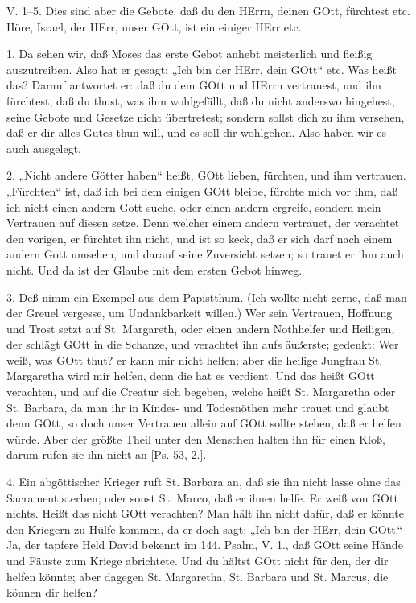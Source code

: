 \begin{schriftzitat}
V. 1–5. Dies sind aber die Gebote, daß du den HErrn, deinen GOtt, fürchtest etc. Höre, Israel, der HErr, unser GOtt, ist ein einiger HErr etc.
\end{schriftzitat}

1. Da sehen wir, daß Moses das erste Gebot anhebt meisterlich und fleißig auszutreiben. Also hat er gesagt: „Ich bin der HErr, dein GOtt“ etc. Was heißt das? Darauf antwortet er: daß du dem GOtt und HErrn vertrauest, und ihn fürchtest, daß du thust, was ihm wohlgefällt, daß du nicht anderswo hingehest, seine Gebote und Gesetze nicht übertretest; sondern sollst dich zu ihm versehen, daß er dir alles Gutes thun will, und es soll dir wohlgehen. Also haben wir es auch ausgelegt.

2. „Nicht andere Götter haben“ heißt, GOtt lieben, fürchten, und ihm vertrauen. „Fürchten“ ist, daß ich bei dem einigen GOtt bleibe, fürchte
mich vor ihm, daß ich nicht einen andern Gott suche, oder einen andern ergreife, sondern mein Vertrauen auf diesen setze. Denn welcher einem andern vertrauet, der verachtet den vorigen, er fürchtet ihn nicht, und ist so keck, daß er sich darf nach einem andern Gott umsehen, und darauf seine Zuversicht setzen; so trauet er ihm auch nicht. Und da ist der Glaube mit dem ersten Gebot hinweg.

3. Deß nimm ein Exempel aus dem Papistthum. (Ich wollte nicht gerne, daß man der Greuel vergesse, um Undankbarkeit willen.) Wer sein Vertrauen, Hoffnung und Trost setzt auf St. Margareth, oder einen andern Nothhelfer und Heiligen, der schlägt GOtt in die Schanze, und verachtet ihn aufs äußerste; gedenkt: Wer weiß, was GOtt thut? er kann mir nicht helfen; aber die heilige Jungfrau St. Margaretha wird mir helfen, denn die hat es verdient. Und das heißt GOtt verachten, und auf die Creatur sich begeben, welche heißt St. Margaretha oder St. Barbara, da man ihr in Kindes- und Todesnöthen mehr trauet und glaubt denn GOtt, so doch unser Vertrauen allein auf GOtt sollte stehen, daß er helfen würde. Aber der größte Theil unter den Menschen halten ihn für einen Kloß, darum rufen sie ihn nicht an [Ps. 53, 2.].

4. Ein abgöttischer Krieger ruft St. Barbara an, daß sie ihn nicht lasse ohne das Sacrament sterben; oder sonst St. Marco, daß er ihnen helfe. Er weiß von GOtt nichts. Heißt das nicht GOtt verachten? Man hält ihn nicht dafür, daß er könnte den Kriegern zu-Hülfe kommen, da er doch sagt: „Ich bin der HErr, dein GOtt.“ Ja, der tapfere Held David bekennt im 144. Psalm, V. 1., daß GOtt seine Hände und Fäuste zum Kriege abrichtete. Und du hältst GOtt nicht für den, der dir helfen könnte; aber dagegen St. Margaretha, St. Barbara und St. Marcus, die können dir helfen?

